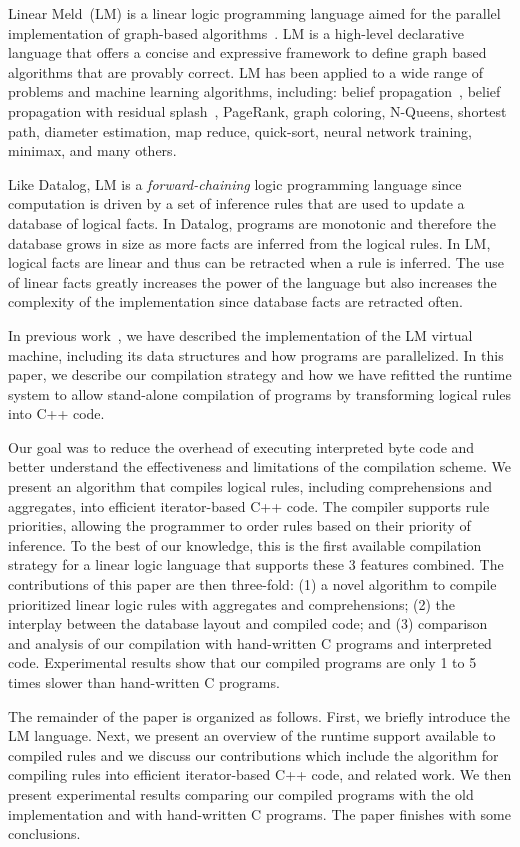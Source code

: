 Linear Meld~(LM) is a linear logic programming language aimed for the parallel
implementation of graph-based algorithms~\cite{cruz-iclp14}.  LM is a high-level
declarative language that offers a concise and expressive framework to define
graph based algorithms that are provably correct.  LM has been applied to a wide
range of problems and machine learning algorithms, including: belief
propagation~\cite{Gonzalez+al:aistats09paraml}, belief propagation with residual
splash~\cite{Gonzalez+al:aistats09paraml}, PageRank, graph coloring, N-Queens,
shortest path, diameter estimation, map reduce, quick-sort, neural network
training, minimax, and many others.

Like Datalog, LM is a \emph{forward-chaining} logic programming language since
computation is driven by a set of inference rules that are used to update a
database of logical facts.  In Datalog, programs are monotonic and therefore the
database grows in size as more facts are inferred from the logical rules. In LM,
logical facts are linear and thus can be retracted when a rule is inferred. The
use of linear facts greatly increases the power of the language but also
increases the complexity of the implementation since database facts are
retracted often.

In previous work~\cite{cruz-ppdp14}, we have described the implementation of the
LM virtual machine, including its data structures and how programs are
parallelized. In this paper, we describe our compilation strategy
and how we have refitted the runtime system to allow stand-alone compilation of
programs by transforming logical rules into C++ code.

Our goal was to reduce the overhead of executing interpreted byte code and
better understand the effectiveness and limitations of the compilation scheme.
We present an algorithm that compiles logical rules, including comprehensions
and aggregates, into efficient iterator-based C++ code.  The compiler supports
rule priorities, allowing the programmer to order rules based on their priority
of inference. To the best of our knowledge, this is the first available
compilation strategy for a linear logic language that supports these 3 features
combined. The contributions of this paper are then three-fold: (1) a novel
algorithm to compile prioritized linear logic rules with aggregates and
comprehensions; (2) the interplay between the database layout and compiled code;
and (3) comparison and analysis of our compilation with hand-written C programs
and interpreted code.  Experimental results show that our compiled programs are
only 1 to 5 times slower than hand-written C programs.

The remainder of the paper is organized as follows. First, we briefly introduce
the LM language. Next, we present an overview of the runtime support available
to compiled rules and we discuss our contributions which include the algorithm
for compiling rules into efficient iterator-based C++ code, and related work. We
then present experimental results comparing our compiled programs with the old
implementation and with hand-written C programs.  The paper finishes with some
conclusions.
